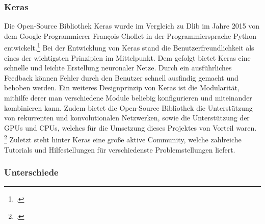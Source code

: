 \documentclass[12pt, a4paper]{scrbook}
\begin{document}
\subsubsection{Keras}
Die Open-Source Bibliothek Keras wurde im Vergleich zu Dlib im Jahre 2015 von dem Google-Programmierer François Chollet in der Programmiersprache Python entwickelt.\footcite[Vgl.]{Keras}
Bei der Entwicklung von Keras stand die Benutzerfreundlichkeit als eines der wichtigsten Prinzipien im Mittelpunkt. Dem gefolgt bietet Keras eine schnelle und leichte Erstellung neuronaler Netze. Durch ein ausführliches Feedback können Fehler durch den Benutzer schnell ausfindig gemacht und behoben werden. Ein weiteres Designprinzip von Keras ist die Modularität, mithilfe derer man verschiedene Module beliebig konfigurieren und miteinander kombinieren kann. Zudem bietet die Open-Source Bibliothek die Unterstützung von rekurrenten und konvolutionalen Netzwerken, sowie die Unterstützung der GPUs und CPUs, welches für die Umsetzung dieses Projektes von Vorteil waren.
\footcite[Vgl.]{Keras2}
Zuletzt steht hinter Keras eine große aktive Community, welche zahlreiche Tutorials und Hilfestellungen für verschiedenste Problemstellungen liefert.


\subsubsection{Unterschiede}
\end{document}
